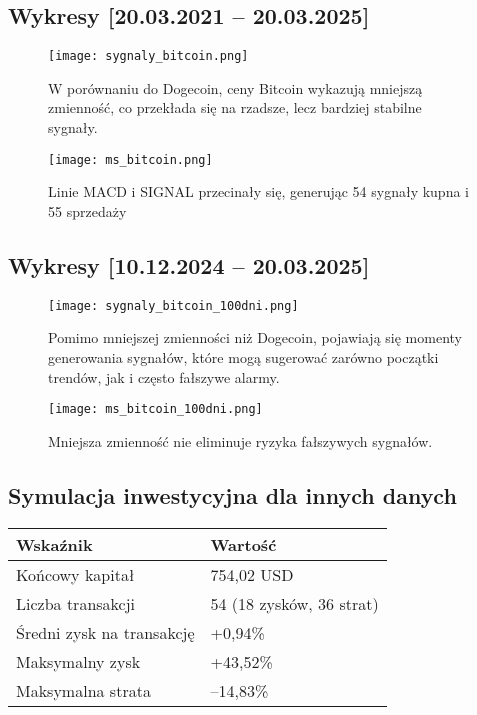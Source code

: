 \documentclass[a4paper,12pt]{article}
\begin{document}
\subsection{Wykresy [20.03.2021 – 20.03.2025]}
\begin{figure}[H]
  \centering
  \texttt{[image: sygnaly\_bitcoin.png]}
  \par\vspace{0.5em}
  \parbox{0.9\textwidth}{\centering\small W porównaniu do Dogecoin, ceny Bitcoin wykazują mniejszą zmienność, co przekłada się na rzadsze, lecz bardziej stabilne sygnały. }
\end{figure}

\begin{figure}[H]
  \centering
  \texttt{[image: ms\_bitcoin.png]}
  \par\vspace{0.5em}
  \parbox{0.9\textwidth}{\centering\small Linie MACD i SIGNAL przecinały się, generując 54 sygnały kupna i 55 sprzedaży }
\end{figure}

\subsection{Wykresy [10.12.2024 – 20.03.2025]}

\begin{figure}[H]
  \centering
  \texttt{[image: sygnaly\_bitcoin\_100dni.png]}
  \par\vspace{0.5em}
  \parbox{0.9\textwidth}{\centering\small Pomimo mniejszej zmienności niż Dogecoin, pojawiają się momenty generowania sygnałów, które mogą sugerować zarówno początki trendów, jak i często fałszywe alarmy. }
\end{figure}

\begin{figure}[H]
  \centering
  \texttt{[image: ms\_bitcoin\_100dni.png]}
  \par\vspace{0.5em}
  \parbox{0.9\textwidth}{\centering\small Mniejsza zmienność nie eliminuje ryzyka fałszywych sygnałów. }
\end{figure}

\subsection{Symulacja inwestycyjna dla innych danych}
\begin{table}[H]
\centering
\begin{tabular}{|p{6cm}|p{6cm}|}
\hline
\textbf{Wskaźnik} & \textbf{Wartość} \\
\hline
Końcowy kapitał & 754{,}02 USD \\
\hline
Liczba transakcji & 54 (18 zysków, 36 strat) \\
\hline
Średni zysk na transakcję & +0{,}94\% \\
\hline
Maksymalny zysk & +43{,}52\% \\
\hline
Maksymalna strata & –14{,}83\% \\
\hline
\end{tabular}
\end{table}
\end{document}
